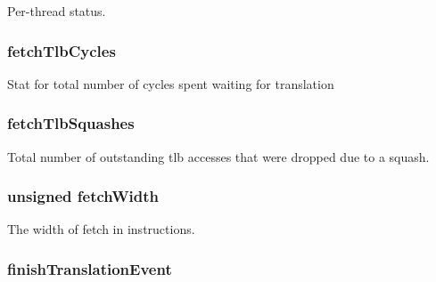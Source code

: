 \label{classDefaultFetch_a852cb41bf6074487410b49ec9ff53c00}
Per-\/thread status. \hypertarget{classDefaultFetch_a9b08d665534d5e7d5b8134c4af16881d}{
\subsubsection[{fetchTlbCycles}]{ {\bf fetchTlbCycles}}}
\label{classDefaultFetch_a9b08d665534d5e7d5b8134c4af16881d}
Stat for total number of cycles spent waiting for translation \hypertarget{classDefaultFetch_afe07cb06e5135b2305320fa11fda71af}{
\subsubsection[{fetchTlbSquashes}]{ {\bf fetchTlbSquashes}}}
\label{classDefaultFetch_afe07cb06e5135b2305320fa11fda71af}
Total number of outstanding tlb accesses that were dropped due to a squash. \hypertarget{classDefaultFetch_a89b5ed63a2dba82556b909f343319416}{
\subsubsection[{fetchWidth}]{\setlength{\rightskip}{0pt plus 5cm}unsigned {\bf fetchWidth}}}
\label{classDefaultFetch_a89b5ed63a2dba82556b909f343319416}
The width of fetch in instructions. \hypertarget{classDefaultFetch_a7bfa632a0dd4f5a541ceb627255286d3}{
\subsubsection[{finishTranslationEvent}]{ {\bf finishTranslationEvent}}}
